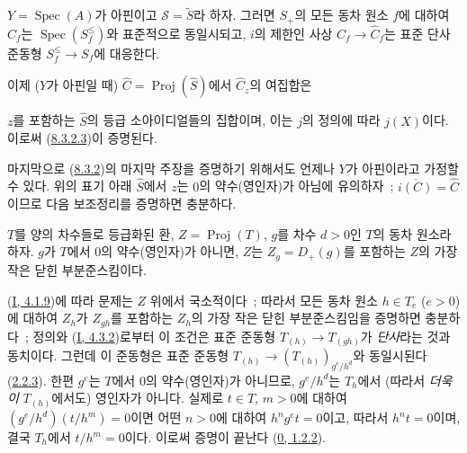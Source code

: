 \begin{env}[8.3.2.6]
\label{II.8.3.2.6-ko}
$Y=\operatorname{Spec}(A)$가 아핀이고 $\mathcal{S}=\widetilde{S}$라 하자.
그러면 $S_+$의 모든 동차 원소 $f$에 대하여 $\widehat{C}_f$는
$\operatorname{Spec}(S_f^{\leq})$와 표준적으로 동일시되고, $i$의
제한인 사상 $C_f\to\widehat{C}_f$는 표준 단사 준동형
$S_f^{\leq}\to S_f$에 대응한다.
\end{env}

이제 ($Y$가 아핀일 때) $\widehat{C}=\operatorname{Proj}(\widehat{S})$에서
$\widehat{C}_z$의 여집합은

$z$를 포함하는 $\widehat{S}$의 등급 소아이디얼들의 집합이며, 이는
$j$의 정의에 따라 $j(X)$이다. 이로써
(\hyperref[II.8.3.2.3-ko]{8.3.2.3})이 증명된다.

마지막으로 (\hyperref[II.8.3.2-ko]{8.3.2})의 마지막 주장을 증명하기
위해서도 언제나 $Y$가 아핀이라고 가정할 수 있다. 위의 표기 아래
$\widehat{S}$에서 $z$는 $0$의 약수(영인자)가 아님에 유의하자~;
$\overline{i(C)}=\widehat{C}$이므로 다음 보조정리를 증명하면 충분하다.

\begin{lemma}[8.3.2.7]
\label{II.8.3.2.7-ko}
$T$를 양의 차수들로 등급화된 환, $Z=\operatorname{Proj}(T)$,
$g$를 차수 $d>0$인 $T$의 동차 원소라 하자. $g$가 $T$에서 $0$의
약수(영인자)가
아니면, $Z$는 $Z_g=D_+(g)$를 포함하는 $Z$의 가장 작은 닫힌
부분준스킴이다.
\end{lemma}

(\hyperref[I.4.1.9-ko]{I, 4.1.9})에 따라 문제는 $Z$ 위에서 국소적이다~;
따라서 모든 동차 원소 $h\in T_e$ ($e>0$)에 대하여 $Z_h$가
$Z_{gh}$를 포함하는 $Z_h$의 가장 작은 닫힌 부분준스킴임을 증명하면
충분하다~; 정의와 (\hyperref[I.4.3.2-ko]{I, 4.3.2})로부터 이 조건은
표준 준동형 $T_{(h)}\to T_{(gh)}$가 \emph{단사}라는 것과 동치이다.
그런데 이 준동형은 표준 준동형
$T_{(h)}\to(T_{(h)})_{g^e/h^d}$와 동일시된다
(\hyperref[II.2.2.3-ko]{2.2.3}). 한편 $g^e$는 $T$에서 $0$의
약수(영인자)가 아니므로,
$g^e/h^d$는 $T_h$에서 (따라서 \emph{더욱이} $T_{(h)}$에서도) 영인자가
아니다. 실제로 $t\in T$, $m>0$에 대하여
$(g^e/h^d)(t/h^m)=0$이면 어떤 $n>0$에 대하여 $h^ng^et=0$이고, 따라서
$h^nt=0$이며, 결국 $T_h$에서 $t/h^m=0$이다. 이로써 증명이 끝난다
(\hyperref[0.1.2.2-ko]{0, 1.2.2}).

